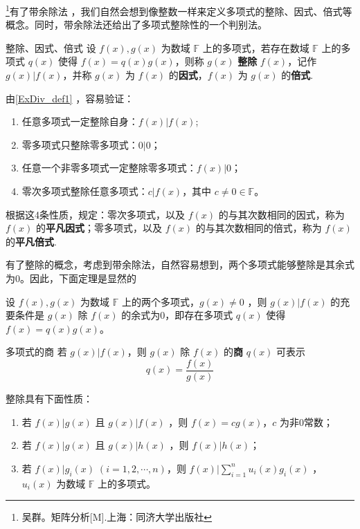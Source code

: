 

\footnote{吴群。矩阵分析[M].上海：同济大学出版社}有了带余除法 ，我们自然会想到像整数一样来定义多项式的整除、因式、倍式等概念。同时，带余除法还给出了多项式整除性的一个判别法。
\begin{definition}{整除、因式、倍式}\label{ExDiv_def1}
设 $f(x),g(x)$ 为数域 $\mathbb{F}$ 上的多项式，若存在数域 $\mathbb{F}$ 上的多项式 $q(x)$ 使得 $f(x)=q(x)g(x)$，则称 $g(x)$ \textbf{整除} $f(x)$，记作 $g(x)|f(x)$，并称 $g(x)$ 为 $f(x)$ 的\textbf{因式}，$f(x)$ 为 $g(x)$ 的\textbf{倍式}.
\end{definition}
由\autoref{ExDiv_def1} ，容易验证：
\begin{enumerate}
\item 任意多项式一定整除自身：$f(x)|f(x)$;
\item 零多项式只整除零多项式：$0|0$；
\item 任意一个非零多项式一定整除零多项式：$f(x)|0$；
\item 零次多项式整除任意多项式：$c|f(x)$，其中 $c\neq0\in\mathbb{F}$。
\end{enumerate}
根据这4条性质，规定：零次多项式，以及 $f(x)$ 的与其次数相同的因式，称为 $f(x)$ 的\textbf{平凡因式}；零多项式，以及 $f(x)$ 的与其次数相同的倍式，称为 $f(x)$ 的\textbf{平凡倍式}.

有了整除的概念，考虑到带余除法，自然容易想到，两个多项式能够整除是其余式为0。因此，下面定理是显然的
\begin{theorem}{}
设 $f(x),g(x)$ 为数域 $\mathbb{F}$ 上的两个多项式，$g(x)\neq 0$ ，则 $g(x)|f(x)$ 的充要条件是 $g(x)$ 除 $f(x)$ 的余式为0，即存在多项式 $q(x)$ 使得 $f(x)=q(x)g(x)$。
\end{theorem}
\begin{definition}{多项式的商}
若 $g(x)|f(x)$，则 $g(x)$ 除 $f(x)$ 的\textbf{商} $q(x)$ 可表示 
\begin{equation}
q(x)=\frac{f(x)}{g(x)}
\end{equation}

\end{definition}

整除具有下面性质：
\begin{enumerate}
\item 若 $f(x)|g(x)$ 且 $g(x)|f(x)$ ，则 $f(x)=cg(x)$，$c$ 为非0常数；
\item 若 $f(x)|g(x)$ 且 $g(x)|h(x)$ ，则 $f(x)|h(x)$；
\item 若 $f(x)|g_i(x)\;(i=1,2,\cdots,n)$，则 $f(x)|\sum\limits_{i=1}^{n}u_i(x)g_i(x)$ ， $u_i(x)$ 为数域 $\mathbb{F}$ 上的多项式。
\end{enumerate}

